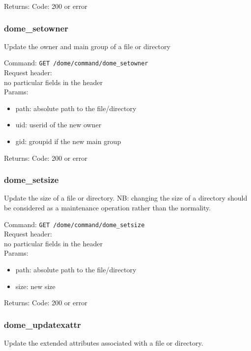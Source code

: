 \documentclass[a4paper,10pt]{scrreprt}
\begin{document}
Returns:
Code: 200 or error


\subsubsection{dome\_setowner}

Update the owner and main group of a file or directory

Command:
\lstinline"GET /dome/command/dome_setowner"\\

Request header:\\
no particular fields in the header\\

Params:
\begin{itemize}
  \item path: absolute path to the file/directory
  \item uid: userid of the new owner
  \item gid: groupid if the new main group
\end{itemize}

Returns:
Code: 200 or error


\subsubsection{dome\_setsize}

Update the size of a file or directory. NB: changing the size of a directory
should be considered as a maintenance operation rather than the normality.

Command:
\lstinline"GET /dome/command/dome_setsize"\\

Request header:\\
no particular fields in the header\\

Params:
\begin{itemize}
  \item path: absolute path to the file/directory
  \item size: new size
\end{itemize}

Returns:
Code: 200 or error



\subsubsection{dome\_updatexattr}

Update the extended attributes associated with a file or directory.
\end{document}
